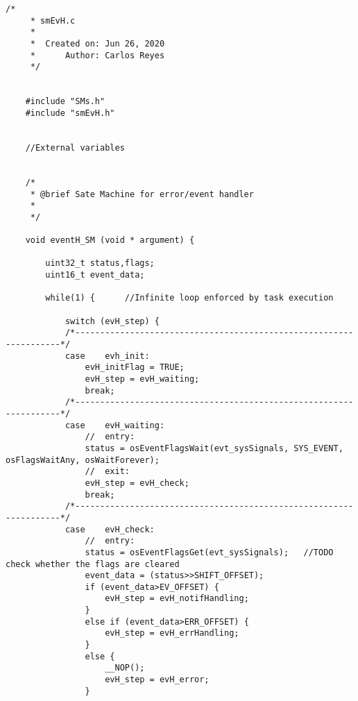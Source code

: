 \begin{lstlisting}[label=lst:event,caption={Main source code for Event Handler DSM.}]
    /*
     * smEvH.c
     *
     *  Created on: Jun 26, 2020
     *      Author: Carlos Reyes
     */
    
    
    #include "SMs.h"
    #include "smEvH.h"
    
    
    //External variables
    
    
    /*
     * @brief Sate Machine for error/event handler
     *
     */
    
    void eventH_SM (void * argument) {
    
        uint32_t status,flags;	
        uint16_t event_data;
    
        while(1) {		//Infinite loop enforced by task execution
    
            switch (evH_step) {
            /*-------------------------------------------------------------------*/
            case	evh_init:
                evH_initFlag = TRUE;
                evH_step = evH_waiting;
                break;
            /*-------------------------------------------------------------------*/
            case	evH_waiting:
                //	entry:
                status = osEventFlagsWait(evt_sysSignals, SYS_EVENT, osFlagsWaitAny, osWaitForever);
                //	exit:
                evH_step = evH_check;
                break;
            /*-------------------------------------------------------------------*/
            case	evH_check:
                //	entry:
                status = osEventFlagsGet(evt_sysSignals);	//TODO check whether the flags are cleared
                event_data = (status>>SHIFT_OFFSET);
                if (event_data>EV_OFFSET) {
                    evH_step = evH_notifHandling;
                }
                else if (event_data>ERR_OFFSET) {
                    evH_step = evH_errHandling;
                }
                else {
                    __NOP();
                    evH_step = evH_error;
                }
    

\end{lstlisting}
